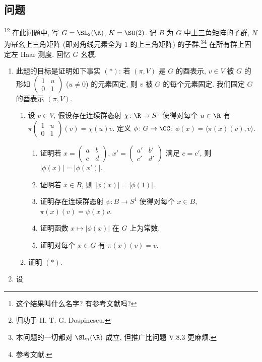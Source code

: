 \subsection{问题}
\label{sec:V.8.4}
\footnote{这个结果叫什么名字? 有参考文献吗?}\footnote{归功于 H. T. G. Dospinescu.}
在此问题中, 写 $G = \SL_2(\R)$, $K = \SO(2)$. 记 $B$ 为 $G$ 中上三角矩阵的子群, $N$ 为幂幺上三角矩阵 (即对角线元素全为 $1$ 的上三角矩阵) 的子群.\footnote{本问题的一切都对 $\SL_n(\R)$ 成立, 但推广比问题 V.8.3 更麻烦.}\footnote{参考文献.}
在所有群上固定左 Haar 测度. 回忆 $G$ 幺模.
\begin{enumerate}
\item[(1)] 此题的目标是证明如下事实 $(*)$: 若 $(\pi, V)$ 是 $G$ 的酉表示, $v \in V$ 被 $G$ 的形如 $\begin{pmatrix} 1 & u \\ 0 & 1 \end{pmatrix}$ ($u \neq 0$) 的元素固定, 则 $v$ 被 $G$ 的每个元素固定.
我们固定 $G$ 的酉表示 $(\pi, V)$.
\begin{enumerate}
\item[(a)] 设 $v \in V$, 假设存在连续群态射 $\chi \colon \R \to S^1$ 使得对每个 $u \in \R$ 有 $\pi\begin{pmatrix} 1 & u \\ 0 & 1 \end{pmatrix}(v) = \chi(u)v$. 定义 $\phi \colon G \to \CC$: $\phi(x) = \langle \pi(x)(v), v \rangle$.
  \begin{enumerate}
  \item[(i)] 证明若 $x = \begin{pmatrix} a & b \\ c & d \end{pmatrix}$, $x' = \begin{pmatrix} a' & b' \\ c' & d' \end{pmatrix}$ 满足 $c = c'$, 则 $|\phi(x)| = |\phi(x')|$.
  \item[(ii)] 证明若 $x \in B$, 则 $|\phi(x)| = |\phi(1)|$.
  \item[(iii)] 证明存在连续群态射 $\psi \colon B \to S^1$ 使得对每个 $x \in B$, $\pi(x)(v) = \psi(x)v$.
  \item[(iv)] 证明函数 $x \longmapsto |\phi(x)|$ 在 $G$ 上为常数.
  \item[(v)] 证明对每个 $x \in G$ 有 $\pi(x)(v) = v$.
  \end{enumerate}
\item[(b)] 证明 $(*)$.
\end{enumerate}
\item[(2)] 设

\end{enumerate}
